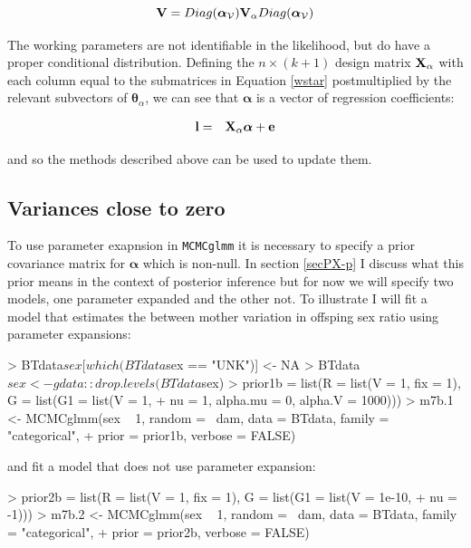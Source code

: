 \documentclass{article}
\begin{document}
\begin{equation} 
{\bf V} = Diag({\bm \alpha}_{\mathcal{V}}){\bf V}_{\alpha}Diag({\bm \alpha}_{\mathcal{V}})
\end{equation} 


The working parameters are not identifiable in the likelihood, but do have a proper conditional distribution. Defining the $n\times(k+1)$ design matrix ${\bf X}_{\alpha}$ with each column equal to the submatrices in Equation \ref{wstar} postmultiplied by the relevant subvectors of ${\bm \theta}_{\alpha}$, we can see that ${\bm \alpha}$ is a vector of regression coefficients: 

\begin{equation}
\begin{array}{rl}
\bf{l} =& {\bf X}_{\alpha}{\bm \alpha}+\bf{e}\\
\end{array}
\end{equation}

and so the methods described above can be used to update them. 

\subsection{Variances close to zero}

To use parameter exapnsion in \texttt{MCMCglmm} it is necessary to specify a prior covariance matrix for ${\bm \alpha}$ which is non-null. In section \ref{secPX-p} I discuss what this prior means in the context of posterior inference but for now we will specify two models, one parameter expanded and the other not. To illustrate I will fit a model that estimates the between mother variation in offsping sex ratio using parameter expansions:

\begin{Schunk}
\begin{Sinput}
> BTdata$sex[which(BTdata$sex == "UNK")] <- NA
> BTdata$sex <- gdata::drop.levels(BTdata$sex)
> prior1b = list(R = list(V = 1, fix = 1), G = list(G1 = list(V = 1, 
+     nu = 1, alpha.mu = 0, alpha.V = 1000)))
> m7b.1 <- MCMCglmm(sex ~ 1, random = ~dam, data = BTdata, family = "categorical", 
+     prior = prior1b, verbose = FALSE)
\end{Sinput}
\end{Schunk}

and fit a model that does not use parameter expansion:

\begin{Schunk}
\begin{Sinput}
> prior2b = list(R = list(V = 1, fix = 1), G = list(G1 = list(V = 1e-10, 
+     nu = -1)))
> m7b.2 <- MCMCglmm(sex ~ 1, random = ~dam, data = BTdata, family = "categorical", 
+     prior = prior2b, verbose = FALSE)
\end{Sinput}
\end{Schunk}
\end{document}
